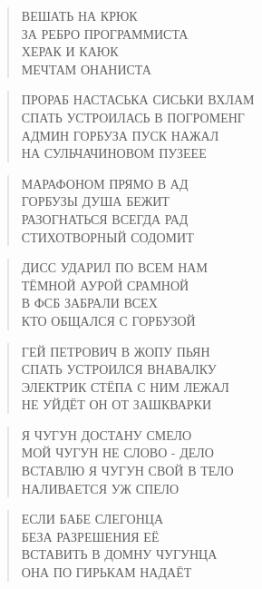 \poemtitle{***}
\begin{verse}
ВЕШАТЬ НА КРЮК\\
ЗА РЕБРО ПРОГРАММИСТА\\
ХЕРАК И КАЮК\\
МЕЧТАМ ОНАНИСТА
\end{verse}

\poemtitle{***}
\begin{verse}
ПРОРАБ НАСТАСЬКА СИСЬКИ ВХЛАМ\\
СПАТЬ УСТРОИЛАСЬ В ПОГРОМЕНГ\\
АДМИН ГОРБУЗА ПУСК НАЖАЛ\\
НА СУЛЬЧАЧИНОВОМ ПУЗЕЕЕ
\end{verse}

\poemtitle{***}
\begin{verse}
МАРАФОНОМ ПРЯМО В АД\\
ГОРБУЗЫ ДУША БЕЖИТ\\
РАЗОГНАТЬСЯ ВСЕГДА РАД\\
СТИХОТВОРНЫЙ СОДОМИТ
\end{verse}

\poemtitle{***}
\begin{verse}
ДИСС УДАРИЛ ПО ВСЕМ НАМ\\
ТЁМНОЙ АУРОЙ СРАМНОЙ\\
В ФСБ ЗАБРАЛИ ВСЕХ\\
КТО ОБЩАЛСЯ С ГОРБУЗОЙ
\end{verse}

\poemtitle{***}
\begin{verse}
ГЕЙ ПЕТРОВИЧ В ЖОПУ ПЬЯН\\
СПАТЬ УСТРОИЛСЯ ВНАВАЛКУ\\
ЭЛЕКТРИК СТЁПА С НИМ ЛЕЖАЛ\\
НЕ УЙДЁТ ОН ОТ ЗАШКВАРКИ
\end{verse}

\poemtitle{***}
\begin{verse}
Я ЧУГУН ДОСТАНУ СМЕЛО\\
МОЙ ЧУГУН НЕ СЛОВО - ДЕЛО\\
ВСТАВЛЮ Я ЧУГУН СВОЙ В ТЕЛО\\
НАЛИВАЕТСЯ УЖ СПЕЛО
\end{verse}

\poemtitle{***}
\begin{verse}
ЕСЛИ БАБЕ СЛЕГОНЦА\\
БЕЗА РАЗРЕШЕНИЯ ЕЁ\\
ВСТАВИТЬ В ДОМНУ ЧУГУНЦА\\
ОНА ПО ГИРЬКАМ НАДАЁТ
\end{verse}

